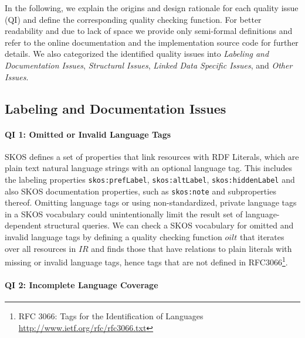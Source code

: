 In the following, we explain the origins and design rationale for each quality issue (QI) and define the corresponding quality checking function. For better readability and due to lack of space we provide only semi-formal definitions and refer to the online documentation and the implementation source code for further details. We also categorized the identified quality issues into \emph{Labeling and Documentation Issues}, \emph{Structural Issues}, \emph{Linked Data Specific Issues}, and \emph{Other Issues}. 



\subsection{Labeling and Documentation Issues}

\paragraph{QI 1: Omitted or Invalid Language Tags}

SKOS defines a set of properties that link resources with RDF Literals, which are plain text natural language strings with an optional language tag. This includes the labeling properties \texttt{skos:prefLabel}, \texttt{skos:altLabel}, \texttt{skos:hiddenLabel} and also SKOS documentation properties, such as \texttt{skos:note} and subproperties thereof. Omitting language tags or using non-standardized, private language tags in a SKOS vocabulary could unintentionally limit the result set of language-dependent structural queries.
We can check a SKOS vocabulary for omitted and invalid language tags by defining a quality checking function $oilt$ that iterates over all resources in $IR$ and finds those that have relations to plain literals with missing or invalid language tags, hence tags that are not defined in RFC3066\footnote{RFC 3066: Tags for the Identification of Languages \url{http://www.ietf.org/rfc/rfc3066.txt}}.

\paragraph{QI 2: Incomplete Language Coverage}


